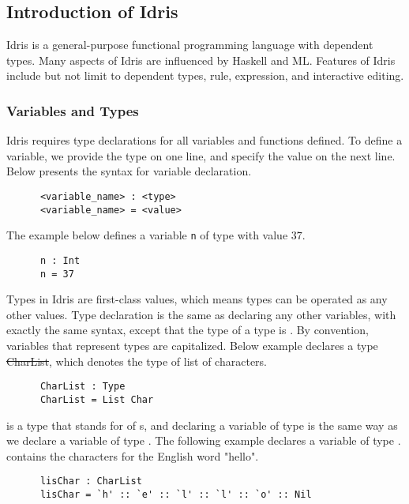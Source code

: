 \subsection{Introduction of Idris}
Idris is a general-purpose functional programming language with dependent types. Many aspects of Idris are influenced by Haskell and ML. Features of Idris include but not limit to dependent types,  rule,  expression, and interactive editing. 

\subsubsection*{Variables and Types}
Idris requires type declarations for all variables and functions defined. To define a variable, we provide the type on one line, and specify the value on the next line. Below presents the syntax for variable declaration. 
\begin{lstlisting}
      <variable_name> : <type> 
      <variable_name> = <value>
\end{lstlisting}
The example below defines a variable \texttt{n} of type  with value $37$. 
\begin{lstlisting}
      n : Int
      n = 37
\end{lstlisting}

Types in Idris are first-class values, which means types can be operated as any other values. Type declaration is the same as declaring any other variables, with exactly the same syntax, except that the type of a type is . By convention, variables that represent types are capitalized. Below example declares a type \st{CharList}, which denotes the type of list of characters. 
\begin{lstlisting}
      CharList : Type
      CharList = List Char
\end{lstlisting}

 is a type that stands for  of s, and declaring a variable of type  is the same way as we declare a variable of type . The following example declares a variable  of type .  contains the characters for the English word "hello". 
\begin{lstlisting}
      lisChar : CharList 
      lisChar = `h' :: `e' :: `l' :: `l' :: `o' :: Nil
\end{lstlisting}


